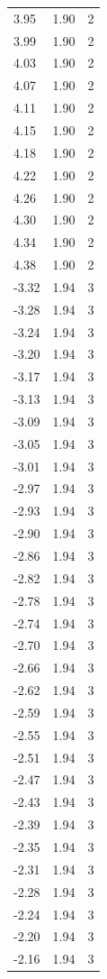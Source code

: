 \begin{longtable}{lrr}
  3.95 & 1.90 & 2 \\
  3.99 & 1.90 & 2 \\
  4.03 & 1.90 & 2 \\
  4.07 & 1.90 & 2 \\
  4.11 & 1.90 & 2 \\
  4.15 & 1.90 & 2 \\
  4.18 & 1.90 & 2 \\
  4.22 & 1.90 & 2 \\
  4.26 & 1.90 & 2 \\
  4.30 & 1.90 & 2 \\
  4.34 & 1.90 & 2 \\
  4.38 & 1.90 & 2 \\
  -3.32 & 1.94 & 3 \\
  -3.28 & 1.94 & 3 \\
  -3.24 & 1.94 & 3 \\
  -3.20 & 1.94 & 3 \\
  -3.17 & 1.94 & 3 \\
  -3.13 & 1.94 & 3 \\
  -3.09 & 1.94 & 3 \\
  -3.05 & 1.94 & 3 \\
  -3.01 & 1.94 & 3 \\
  -2.97 & 1.94 & 3 \\
  -2.93 & 1.94 & 3 \\
  -2.90 & 1.94 & 3 \\
  -2.86 & 1.94 & 3 \\
  -2.82 & 1.94 & 3 \\
  -2.78 & 1.94 & 3 \\
  -2.74 & 1.94 & 3 \\
  -2.70 & 1.94 & 3 \\
  -2.66 & 1.94 & 3 \\
  -2.62 & 1.94 & 3 \\
  -2.59 & 1.94 & 3 \\
  -2.55 & 1.94 & 3 \\
  -2.51 & 1.94 & 3 \\
  -2.47 & 1.94 & 3 \\
  -2.43 & 1.94 & 3 \\
  -2.39 & 1.94 & 3 \\
  -2.35 & 1.94 & 3 \\
  -2.31 & 1.94 & 3 \\
  -2.28 & 1.94 & 3 \\
  -2.24 & 1.94 & 3 \\
  -2.20 & 1.94 & 3 \\
  -2.16 & 1.94 & 3 \\

\end{longtable}
